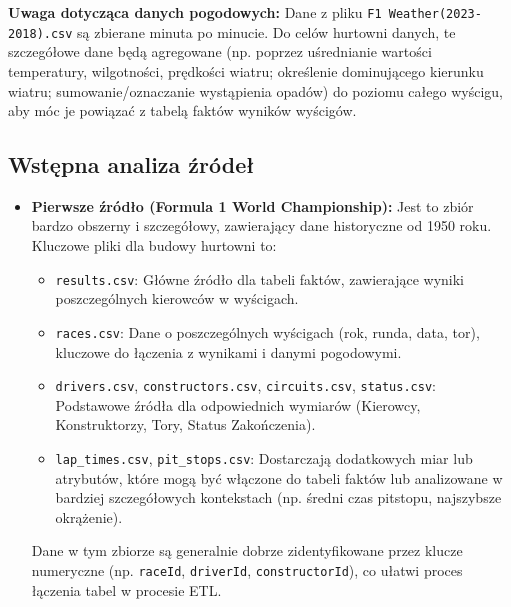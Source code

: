 \documentclass[a4paper,12pt]{article}
\begin{document}
\textbf{Uwaga dotycząca danych pogodowych:} Dane z pliku \texttt{F1 Weather(2023-2018).csv} są zbierane minuta po minucie. Do celów hurtowni danych, te szczegółowe dane będą agregowane (np. poprzez uśrednianie wartości temperatury, wilgotności, prędkości wiatru; określenie dominującego kierunku wiatru; sumowanie/oznaczanie wystąpienia opadów) do poziomu całego wyścigu, aby móc je powiązać z tabelą faktów wyników wyścigów.

\subsection{Wstępna analiza źródeł}
\begin{itemize}[label=\textbullet, leftmargin=*]
  \item \textbf{Pierwsze źródło (Formula 1 World Championship):} Jest to zbiór bardzo obszerny i szczegółowy, zawierający dane historyczne od 1950 roku. Kluczowe pliki dla budowy hurtowni to:
        \begin{itemize}[label=\textendash, leftmargin=1em]
          \item \texttt{results.csv}: Główne źródło dla tabeli faktów, zawierające wyniki poszczególnych kierowców w wyścigach.
          \item \texttt{races.csv}: Dane o poszczególnych wyścigach (rok, runda, data, tor), kluczowe do łączenia z wynikami i danymi pogodowymi.
          \item \texttt{drivers.csv}, \texttt{constructors.csv}, \texttt{circuits.csv}, \texttt{status.csv}: Podstawowe źródła dla odpowiednich wymiarów (Kierowcy, Konstruktorzy, Tory, Status Zakończenia).
          \item \texttt{lap\_times.csv}, \texttt{pit\_stops.csv}: Dostarczają dodatkowych miar lub atrybutów, które mogą być włączone do tabeli faktów lub analizowane w bardziej szczegółowych kontekstach (np. średni czas pitstopu, najszybsze okrążenie).
        \end{itemize}
        Dane w tym zbiorze są generalnie dobrze zidentyfikowane przez klucze numeryczne (np. \texttt{raceId}, \texttt{driverId}, \texttt{constructorId}), co ułatwi proces łączenia tabel w procesie ETL.


\end{itemize}
\end{document}
